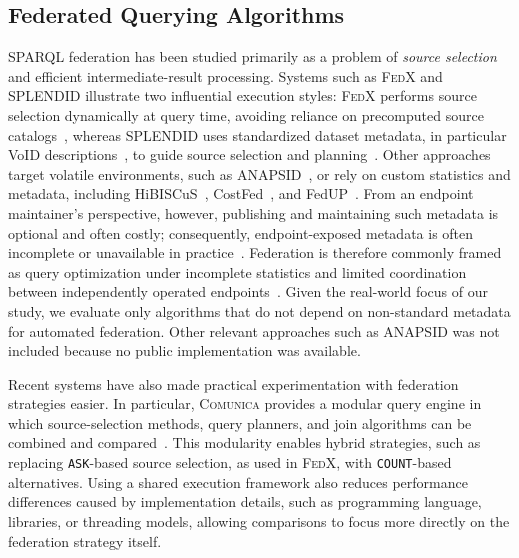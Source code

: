 \documentclass[runningheads]{llncs}
\begin{document}
\subsection{Federated Querying Algorithms}\label{sec3.1}
SPARQL federation has been studied primarily as a problem of \textit{source selection} and efficient intermediate-result processing. 
Systems such as \textsc{FedX} and \textsc{SPLENDID} illustrate two influential execution styles: \textsc{FedX} performs source selection dynamically at query time, avoiding reliance on precomputed source catalogs~\cite{schwarte2011fedx}, whereas \textsc{SPLENDID} uses standardized dataset metadata, in particular VoID descriptions~\cite{w3cvoid}, to guide source selection and planning~\cite{splendid2011}.
Other approaches target volatile environments, such as \textsc{ANAPSID}~\cite{anapsid2011}, or rely on custom statistics and metadata, including HiBISCuS~\cite{Saleem2014HiBISCuS}, CostFed~\cite{Saleem2018CostFed}, and FedUP~\cite{davat2024fedup}. 
From an endpoint maintainer’s perspective, however, publishing and maintaining such metadata is optional and often costly; consequently, endpoint-exposed metadata is often incomplete or unavailable in practice~\cite{Vandenbussche2017SPARQLES}. 
Federation is therefore commonly framed as query optimization under incomplete statistics and limited coordination between independently operated endpoints~\cite{montoya2017federation}. 
Given the real-world focus of our study, we evaluate only algorithms that do not depend on non-standard metadata for automated federation. Other relevant approaches such as \textsc{ANAPSID} was not included because no public implementation was available.

Recent systems have also made practical experimentation with federation strategies easier. 
In particular, \textsc{Comunica} provides a modular query engine in which source-selection methods, query planners, and join algorithms can be combined and compared~\cite{taelman2018comunica}. 
This modularity enables hybrid strategies, such as replacing \texttt{ASK}-based source selection, as used in \textsc{FedX}, with \texttt{COUNT}-based alternatives. 
Using a shared execution framework also reduces performance differences caused by implementation details, such as programming language, libraries, or threading models, allowing comparisons to focus more directly on the federation strategy itself.
\end{document}
